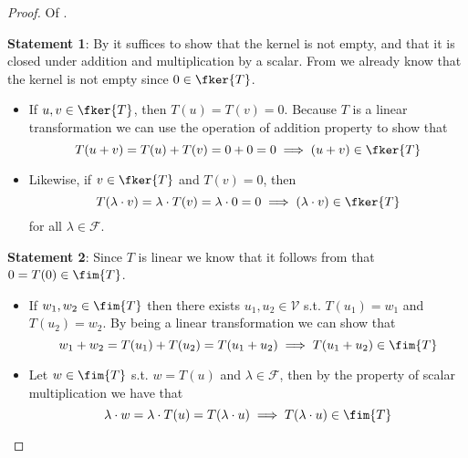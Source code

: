 \begin{proof}
	Of .
	\begin{flushleft}
		\textbf{Statement 1}: By  it suffices to show
		that the kernel is not empty, and that it is closed under addition and
		multiplication by a scalar. From 
		we already know that the kernel is not empty since $0\in\fker{T}$.
		\begin{itemize}
			\item If $u,v\in\fker{T}$, then $T(u)=T(v)=0$. Because
			      $T$ is a linear transformation we can use the operation of addition
			      property to show that
			      \begin{equation*}
				      T(u+v)=T(u)+T(v)=0+0=0\implies (u+v)\in\fker{T}
			      \end{equation*}
			\item Likewise, if $v\in\fker{T}$ and $T(v)=0$, then
			      \begin{equation*}
				      T(\lambda\cdot v)=\lambda\cdot T(v) = \lambda\cdot 0 = 0 \implies (\lambda\cdot v)\in\fker{T}
			      \end{equation*}
			      for all $\lambda\in\mathcal{F}$.
		\end{itemize}
	\end{flushleft}
	\begin{flushleft}
		\textbf{Statement 2}: Since $T$ is linear we know that it follows from
		 that $0=T(0)\in\fim{T}$.
		\begin{itemize}
			\item If $w_1,w_2\in\fim{T}$ then there exists $u_1,u_2\in\mathcal{V}$
			      s.t. $T(u_1)=w_1$ and $T(u_2)=w_2$. By being a linear transformation
			      we can show that
			      \begin{equation*}
				      w_1+w_2=T(u_1)+T(u_2)=T(u_1+u_2)\implies T(u_1+u_2)\in\fim{T}
			      \end{equation*}
			\item Let $w\in\fim{T}$ s.t. $w=T(u)$ and $\lambda\in\mathcal{F}$, then
			      by the property of scalar multiplication we have that
			      \begin{equation*}
				      \lambda\cdot w=\lambda\cdot T(u)=T(\lambda\cdot u) \implies T(\lambda\cdot u)\in\fim{T}
			      \end{equation*}
		\end{itemize}
	\end{flushleft}
	\begin{flushleft}

\end{flushleft}
\end{proof}
